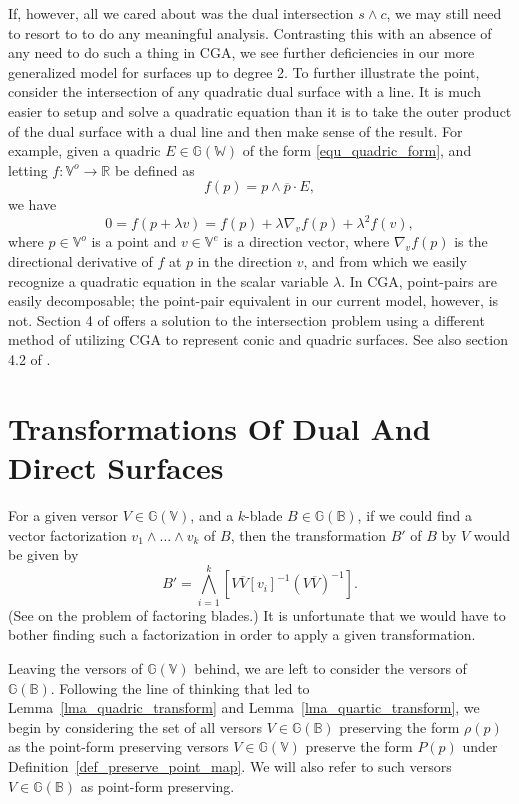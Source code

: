 \documentclass{birkjour}
\theoremstyle{definition}
\theoremstyle{remark}
\numberwithin{equation}{section}
\newcommand{\G}{\mathbb{G}}
\newcommand{\V}{\mathbb{V}}
\newcommand{\W}{\mathbb{W}}
\newcommand{\R}{\mathbb{R}}
\newcommand{\B}{\mathbb{B}}
\begin{document}
If, however, all we cared about was the dual intersection $s\wedge c$, we may still
need to resort to \cite{Wang03} to do any meaningful analysis.
Contrasting this with an absence of any need to do such a thing in CGA,
we see further deficiencies in our more generalized model for surfaces
up to degree 2.
To further illustrate the point, consider the intersection of any quadratic dual surface with a line.
It is much easier to setup and solve a quadratic equation than it is to take the outer
product of the dual surface with a dual line and then make sense of the result.  For example,
given a quadric $E\in\G(\W)$ of the form \eqref{equ_quadric_form}, and
letting $f:\V^o\to\R$ be defined as
\begin{equation}
f(p)=p\wedge\overline{p}\cdot E,
\end{equation}
we have
\begin{equation}
0 = f(p+\lambda v) = f(p)+\lambda \nabla_v f(p)+\lambda^2 f(v),
\end{equation}
where $p\in\V^o$ is a point and $v\in\V^e$ is a direction vector, where
$\nabla_v f(p)$ is the directional derivative of $f$ at $p$ in the direction $v$, and from
which we easily recognize a quadratic equation in the scalar variable $\lambda$.
In CGA, point-pairs are easily decomposable; the point-pair equivalent
in our current model, however, is not.  Section 4 of \cite{Lasenby05} offers
a solution to the intersection problem using a different method of utilizing CGA to
represent conic and quadric surfaces.  See also section 4.2 of \cite{Wareham05}.

\section{Transformations Of Dual And Direct Surfaces}

For a given versor $V\in\G(\V)$,
and a $k$-blade $B\in\G(\B)$, if we could find a vector factorization $v_1\wedge\dots\wedge v_k$
of $B$, then the transformation $B'$ of $B$ by $V$ would be given by
\begin{equation}
B' = \bigwedge_{i=1}^k [V\overline{V}[v_i]^{-1}(V\overline{V})^{-1}].
\end{equation}
(See \cite{Fontijne10} on the problem of factoring blades.)  It is unfortunate that we would
have to bother finding such a factorization in order to apply a given transformation.

Leaving the versors of $\G(\V)$ behind, we are left to consider the versors of $\G(\B)$.
Following the line of thinking that led to Lemma~\ref{lma_quadric_transform} and 
Lemma~\ref{lma_quartic_transform}, we begin by
considering the set of all versors $V\in\G(\B)$ preserving the form $\rho(p)$ as
the point-form preserving versors $V\in\G(\V)$ preserve the form $P(p)$
under Definition~\ref{def_preserve_point_map}.
We will also refer to such versors $V\in\G(\B)$ as point-form preserving.
\end{document}

